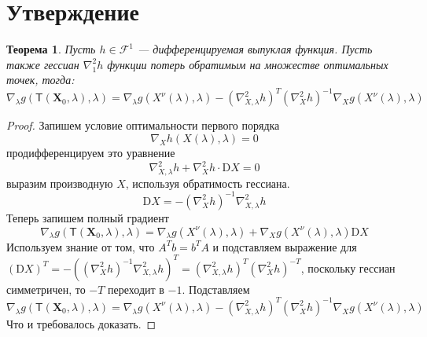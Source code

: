 \documentclass[a4paper,14pt]{extarticle}
\newtheorem{theorem}{Теорема}
\numberwithin{equation}{section}
\begin{document}
\section{Утверждение}
\begin{theorem}
	Пусть $h \in \mathcal{F}^1$ --- дифференцируемая выпуклая функция. Пусть также гессиан $\nabla^2_1 h$ функции потерь обратимым на множестве оптимальных точек, тогда:
$$
	\nabla_\lambda g\left(\mathsf{T}\left(\bm{X}_{0}, \lambda\right), \lambda\right) = \nabla_{\lambda} g(X^{\nu}(\lambda),\lambda)-\left(\nabla_{X,\lambda}^{2} h\right)^{T}\left(\nabla_{X}^{2} h\right)^{-1} \nabla_{X} g(X^{\nu}(\lambda),\lambda)
$$
\end{theorem}
\begin{proof}
	Запишем условие оптимальности первого порядка
	$$\nabla_{X} h(X(\lambda), \lambda)=0$$
	продифференцируем это уравнение
	$$
	\nabla_{X,\lambda}^{2} h+\nabla_{X}^{2} h \cdot \mathrm{D} X=0
	$$
	выразим производную $X$, используя обратимость гессиана.
	$$
	\mathrm{D} X = - \left(\nabla_{X}^{2} h\right)^{-1}\nabla_{X,\lambda}^{2} h
	$$
	Теперь запишем полный градиент
	$$
		\nabla_\lambda g\left(\mathsf{T}\left(\bm{X}_{0}, \lambda\right), \lambda\right) = \nabla_{\lambda} g(X^{\nu}(\lambda),\lambda) +  \nabla_{X} g(X^{\nu}(\lambda),\lambda) \mathrm{D} X
	$$
	Используем знание от том, что $A^Tb = b^TA$ и подставляем выражение для $\left(\mathrm{D} X\right)^T = - \left(\left(\nabla_{X}^{2} h\right)^{-1}\nabla_{X,\lambda}^{2} h\right)^T = \left(\nabla_{X,\lambda}^{2} h\right)^T\left(\nabla_{X}^{2} h\right)^{-T}$, поскольку гессиан симметричен, то $-T$ переходит в $-1$. Подставляем
	$$
	\nabla_\lambda g\left(\mathsf{T}\left(\bm{X}_{0}, \lambda\right), \lambda\right) = \nabla_{\lambda} g(X^{\nu}(\lambda),\lambda)-\left(\nabla_{X,\lambda}^{2} h\right)^{T}\left(\nabla_{X}^{2} h\right)^{-1} \nabla_{X} g(X^{\nu}(\lambda),\lambda)
	$$
	Что и требовалось доказать.
\end{proof}
\end{document}
